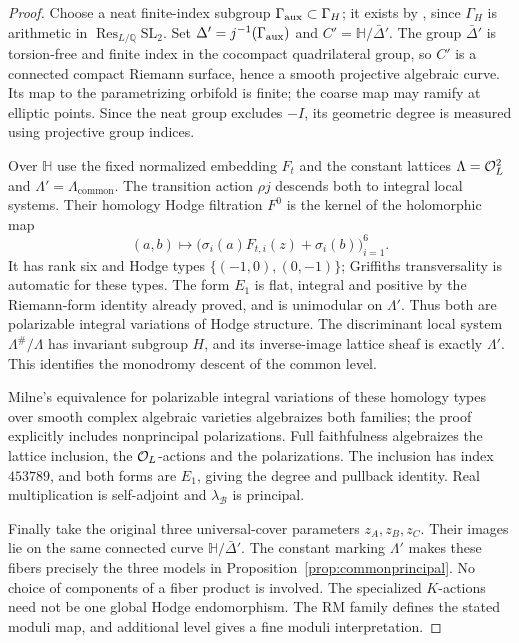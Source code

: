 \begin{proof}
Choose a neat finite-index subgroup $\Gamma_{\rm aux}\subset\Gamma_H$;
it exists by \cite[Thm.~3.6]{MilneModuli2011}, since $\Gamma_H$ is
arithmetic in $\operatorname{Res}_{L/\mathbb Q}\mathrm{SL}_2$.
Set $\Delta'=j^{-1}(\Gamma_{\rm aux})$ and
$C'=\mathbb H/\bar\Delta'$. The group $\bar\Delta'$ is torsion-free and
finite index in the cocompact quadrilateral group, so $C'$ is a connected
compact Riemann surface, hence a smooth projective algebraic curve.
Its map to the parametrizing orbifold is finite; the coarse map may
ramify at elliptic points. Since the neat group excludes $-I$, its
geometric degree is measured using projective group indices.

Over $\mathbb H$ use the fixed normalized embedding $F_t$ and the constant
lattices $\Lambda=\mathcal O_L^2$ and $\Lambda'=\Lambda_{\mathrm{common}}$.
The transition action $\rho j$ descends both to integral local systems.
Their homology Hodge filtration $F^0$ is the kernel of the holomorphic map
\[
 (a,b)\longmapsto
 \bigl(\sigma_i(a)F_{t,i}(z)+\sigma_i(b)\bigr)_{i=1}^6.
\]
It has rank six and Hodge types $\{(-1,0),(0,-1)\}$; Griffiths
transversality is automatic for these types. The form $E_1$ is flat,
integral and positive by the Riemann-form identity already proved, and
is unimodular on $\Lambda'$. Thus both are polarizable integral
variations of Hodge structure. The discriminant local system
$\Lambda^\#/\Lambda$ has invariant subgroup $H$, and its inverse-image
lattice sheaf is exactly $\Lambda'$. This identifies the monodromy descent
of the common level.

Milne's equivalence for polarizable integral variations of these homology
types over smooth complex algebraic varieties
\cite[Thm.~7.13]{MilneModuli2011} algebraizes both families; the proof
explicitly includes nonprincipal polarizations. Full faithfulness
algebraizes the lattice inclusion, the $\mathcal O_L$-actions and the
polarizations. The inclusion has index $453789$, and both forms are
$E_1$, giving the degree and pullback identity. Real multiplication is
self-adjoint and $\lambda_{\mathcal B}$ is principal.

Finally take the original three universal-cover parameters $z_A,z_B,z_C$.
Their images lie on the same connected curve $\mathbb H/\bar\Delta'$.
The constant marking $\Lambda'$ makes these fibers precisely the
three models in Proposition~\ref{prop:commonprincipal}. No choice of
components of a fiber product is involved. The specialized $K$-actions
need not be one global Hodge endomorphism. The RM family defines the
stated moduli map, and additional level gives a fine moduli interpretation.
\end{proof}

